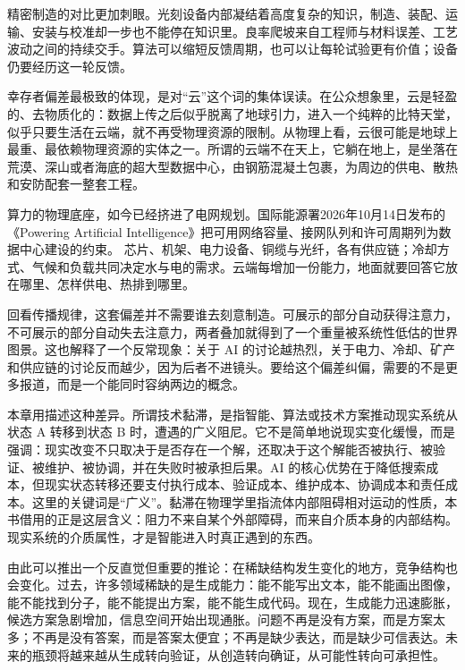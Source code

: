 精密制造的对比更加刺眼。光刻设备内部凝结着高度复杂的知识，制造、装配、运输、安装与校准却一步也不能停在知识里。良率爬坡来自工程师与材料误差、工艺波动之间的持续交手。算法可以缩短反馈周期，也可以让每轮试验更有价值；设备仍要经历这一轮反馈。


幸存者偏差最极致的体现，是对“云”这个词的集体误读。在公众想象里，云是轻盈的、去物质化的：数据上传之后似乎脱离了地球引力，进入一个纯粹的比特天堂，似乎只要生活在云端，就不再受物理资源的限制。从物理上看，云很可能是地球上最重、最依赖物理资源的实体之一。所谓的云端不在天上，它躺在地上，是坐落在荒漠、深山或者海底的超大型数据中心，由钢筋混凝土包裹，为周边的供电、散热和安防配套一整套工程。

算力的物理底座，如今已经挤进了电网规划。国际能源署2026年10月14日发布的《Powering Artificial Intelligence》把可用网络容量、接网队列和许可周期列为数据中心建设的约束。\cite{iea2026powering} 芯片、机架、电力设备、铜缆与光纤，各有供应链；冷却方式、气候和负载共同决定水与电的需求。云端每增加一份能力，地面就要回答它放在哪里、怎样供电、热排到哪里。

回看传播规律，这套偏差并不需要谁去刻意制造。可展示的部分自动获得注意力，不可展示的部分自动失去注意力，两者叠加就得到了一个重量被系统性低估的世界图景。这也解释了一个反常现象：关于 AI 的讨论越热烈，关于电力、冷却、矿产和供应链的讨论反而越少，因为后者不进镜头。要给这个偏差纠偏，需要的不是更多报道，而是一个能同时容纳两边的概念。


本章用描述这种差异。所谓技术黏滞，是指智能、算法或技术方案推动现实系统从状态 A 转移到状态 B 时，遭遇的广义阻尼。它不是简单地说现实变化缓慢，而是强调：现实改变不只取决于是否存在一个解，还取决于这个解能否被执行、被验证、被维护、被协调，并在失败时被承担后果。AI 的核心优势在于降低搜索成本，但现实状态转移还要支付执行成本、验证成本、维护成本、协调成本和责任成本。这里的关键词是“广义”。黏滞在物理学里指流体内部阻碍相对运动的性质，本书借用的正是这层含义：阻力不来自某个外部障碍，而来自介质本身的内部结构。现实系统的介质属性，才是智能进入时真正遇到的东西。

由此可以推出一个反直觉但重要的推论：在稀缺结构发生变化的地方，竞争结构也会变化。过去，许多领域稀缺的是生成能力：能不能写出文本，能不能画出图像，能不能找到分子，能不能提出方案，能不能生成代码。现在，生成能力迅速膨胀，候选方案急剧增加，信息空间开始出现通胀。问题不再是没有方案，而是方案太多；不再是没有答案，而是答案太便宜；不再是缺少表达，而是缺少可信表达。未来的瓶颈将越来越从生成转向验证，从创造转向确证，从可能性转向可承担性。

